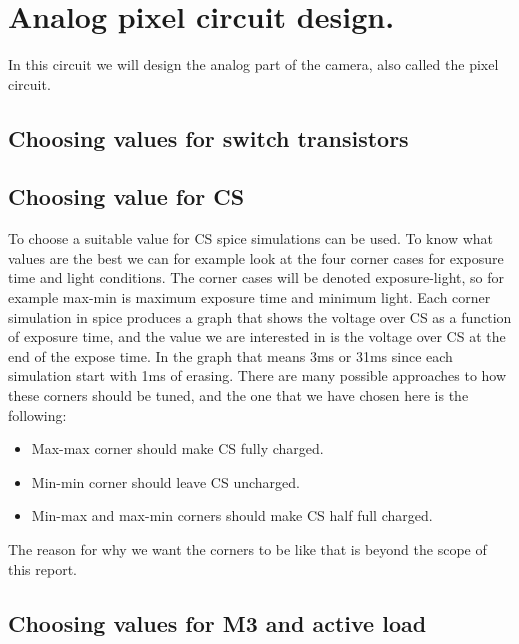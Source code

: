 \section{Analog pixel circuit design.}

In this circuit we will design the analog part of the camera, also called the pixel circuit.

\subsection{Choosing values for switch transistors}

\subsection{Choosing value for CS}

To choose a suitable value for CS spice simulations can be used. To know what values are the best we can for example look at the four corner cases for exposure time and light conditions. The corner cases will be denoted exposure-light, so for example max-min is maximum exposure time and minimum light. Each corner simulation in spice produces a graph that shows the voltage over CS as a function of exposure time, and the value we are interested in is the voltage over CS at the end of the expose time. In the graph that means 3ms or 31ms since each simulation start with 1ms of erasing. There are many possible approaches to how these corners should be tuned, and the one that we have chosen here is the following:

\begin{itemize}
    \item Max-max corner should make CS fully charged.
    \item Min-min corner should leave CS uncharged.
    \item Min-max and max-min corners should make CS half full charged.
\end{itemize}

The reason for why we want the corners to be like that is beyond the scope of this report.

\subsection{Choosing values for M3 and active load}
